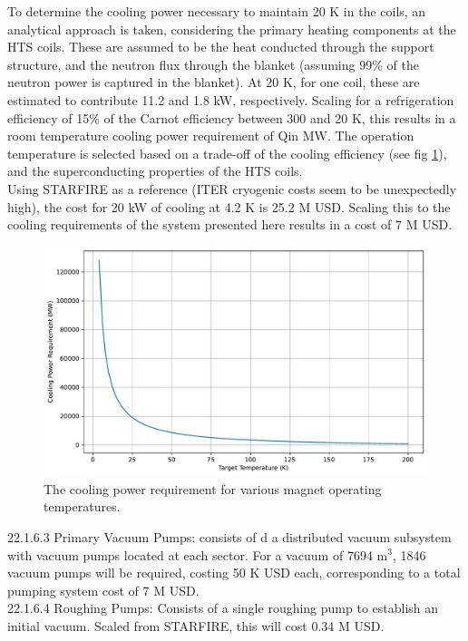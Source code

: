 To determine the cooling power necessary to maintain 20 K in the coils, an analytical approach is taken, considering the primary heating components at the HTS coils. These are assumed to be the heat conducted through the support structure, and the neutron flux through the blanket (assuming 99\% of the neutron power is captured in the blanket). At 20 K, for one coil, these are estimated to contribute 11.2 and 1.8 kW, respectively. Scaling for a refrigeration efficiency of 15\% of the Carnot efficiency between 300 and 20 K, this results in a room temperature cooling power requirement of Qin MW. The operation temperature is selected based on a trade-off of the cooling efficiency (see fig \ref{fig:cool_eff}), and the superconducting properties of the HTS coils.\\

Using STARFIRE as a reference (ITER cryogenic costs seem to be unexpectedly high), the cost for 20 kW of cooling at 4.2 K is 25.2 M USD. Scaling this to the cooling requirements of the system presented here results in a cost of 7 M USD. \\

\begin{figure}[h]
    \centering
    \includegraphics[width=0.75\linewidth]{Figures/cooling_efficiency.pdf}
    \caption{The cooling power requirement for various magnet operating temperatures.}
    \label{fig:cool_eff}
\end{figure}



22.1.6.3 Primary Vacuum Pumps: consists of d a distributed vacuum subsystem with vacuum pumps located at each sector. For a vacuum of 7694 m$^3$, 1846 vacuum pumps will be required, costing 50 K USD each, corresponding to a total pumping system cost of 7 M USD.\\

22.1.6.4 Roughing Pumps: Consists of a single roughing pump to establish an initial vacuum. Scaled from STARFIRE, this will cost 0.34 M USD.

